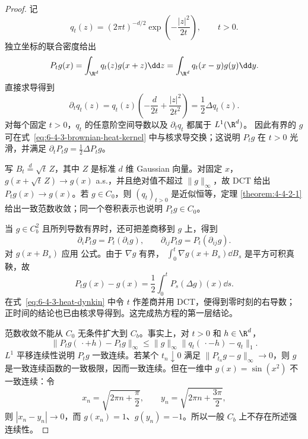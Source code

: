 \begin{proof}
记
\[
 q_t(z)=(2\pi t)^{-d/2}\exp\!\left(-\frac{|z|^2}{2t}\right),
 \qquad t>0.
\]
独立坐标的联合密度给出
\begin{equation}\label{eq:6-4-3-brownian-heat-kernel}
 P_tg(x)=\int_{\R^d}q_t(z)g(x+z)\dd z
       =\int_{\R^d}q_t(x-y)g(y)\dd y.
\end{equation}
直接求导得到
\[
 \partial_tq_t(z)
 =q_t(z)\left(-\frac d{2t}+\frac{|z|^2}{2t^2}\right)
 =\frac12\Delta q_t(z).
\]
对每个固定 $t>0$，$q_t$ 的任意阶空间导数以及 $\partial_tq_t$ 都属于 $L^1(\R^d)$。
因此有界的 $g$ 可在式~\eqref{eq:6-4-3-brownian-heat-kernel} 中与核求导交换；这说明
$P_tg$ 在 $t>0$ 光滑，并满足 $\partial_tP_tg=\frac12\Delta P_tg$。

写 $B_t\overset{d}=\sqrt t\,Z$，其中 $Z$ 是标准 $d$ 维 Gaussian 向量。对固定 $x$，
$g(x+\sqrt t\,Z)\to g(x)$ a.s.，并且绝对值不超过 $\|g\|_\infty$，故 DCT 给出
$P_tg(x)\to g(x)$。若 $g\in C_0$，则 $(q_t)_{t>0}$ 是近似恒等，定理
\ref{theorem:4-4-2-1} 给出一致范数收敛；同一个卷积表示也说明 $P_tg\in C_0$。

当 $g\in C_b^2$ 且所列导数有界时，还可把差商移到 $g$ 上，得到
\[
 \partial_iP_tg=P_t(\partial_i g),\qquad
 \partial_{ij}P_tg=P_t(\partial_{ij}g).
\]
对 $g(x+B_s)$ 应用 \Ito{} 公式。由于 $\nabla g$ 有界，
$\int_0^t\nabla g(x+B_s)\dd B_s$ 是平方可积真鞅，故
\begin{equation}\label{eq:6-4-3-heat-dynkin}
 P_tg(x)-g(x)=\frac12\int_0^tP_s(\Delta g)(x)\dd s.
\end{equation}
在式~\eqref{eq:6-4-3-heat-dynkin} 中令 $t$ 作差商并用 DCT，便得到零时刻的右导数；
正时间的结论也已由核求导得到。这完成热方程的第一层结论。

范数收敛不能从 $C_0$ 无条件扩大到 $C_b$。事实上，对 $t>0$ 和 $h\in\R^d$，
\[
 \|P_tg(\,\cdot+h)-P_tg\|_\infty
 \le\|g\|_\infty\|q_t(\,\cdot-h)-q_t\|_1.
\]
$L^1$ 平移连续性说明 $P_tg$ 一致连续。若某个 $t_n\downarrow0$ 满足
$\|P_{t_n}g-g\|_\infty\to0$，则 $g$ 是一致连续函数的一致极限，因而一致连续。但在一维中
$g(x)=\sin(x^2)$ 不一致连续：令
\[
 x_n=\sqrt{2\pi n+\frac\pi2},\qquad
 y_n=\sqrt{2\pi n+\frac{3\pi}2},
\]
则 $|x_n-y_n|\to0$，而 $g(x_n)=1$、$g(y_n)=-1$。所以一般 $C_b$ 上不存在所述强连续性。


\end{proof}
